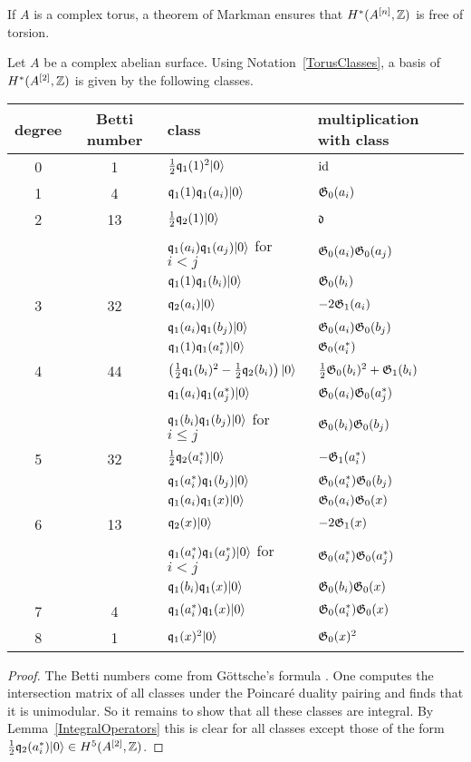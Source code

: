 \begin{remark}
If $A$ is a complex torus, a theorem of Markman \cite{Markman} ensures that $H^*(A^{[n]},\mathbb{Z})$ is free of torsion.
\end{remark} 

\begin{proposition} \label{A2Basis}
Let $A$ be a complex abelian surface. Using Notation~\ref{TorusClasses}, a basis of $H^*(A^{[2]},\mathbb{Z})$ is given by the following classes.
\begin{center}
\begin{tabular}{c|c|l|l}
 degree & Betti number & class & multiplication with class \\\hline
 0 & 1 & $\frac{1}{2}\mathfrak{q}_1(1)^2|0\rangle$ & $\operatorname{id}$ \\ \hline
 1 & 4 &  $\mathfrak{q}_1(1)\mathfrak{q}_1(a_i)|0\rangle$ & $\mathfrak{G}_0(a_i)$ \\ \hline
 2 & 13 & $\frac{1}{2}\mathfrak{q}_2(1)|0\rangle$ & $\mathfrak{d}$ \\ 
   &  & $\mathfrak{q}_1(a_i)\mathfrak{q}_1(a_j)|0\rangle$ for $i<j$ & $\mathfrak{G}_0(a_i)\mathfrak{G}_0(a_j)$ \\
   &  & $\mathfrak{q}_1(1)\mathfrak{q}_1(b_i)|0\rangle$ & $\mathfrak{G}_0(b_i)$ \\\hline
 3 & 32 & $\mathfrak{q}_2(a_i)|0\rangle$  & $-2\mathfrak{G}_1(a_i) $ \\
   &  & $\mathfrak{q}_1(a_i)\mathfrak{q}_1(b_j)|0\rangle$ & $\mathfrak{G}_0(a_i)\mathfrak{G}_0(b_j)$ \\ 
   &  & $\mathfrak{q}_1(1)\mathfrak{q}_1(a^*_i)|0\rangle$ & $\mathfrak{G}_0(a^*_i)$ \\\hline
 4 & 44 & $\left(\frac{1}{2}\mathfrak{q}_1(b_i)^2-\frac{1}{2}\mathfrak{q}_2(b_i)\right)|0\rangle$ & $\frac{1}{2} \mathfrak{G}_0(b_i)^2 + \mathfrak{G}_1(b_i) $ \\
   &  & $\mathfrak{q}_1(a_i)\mathfrak{q}_1(a^*_j)|0\rangle$ & $\mathfrak{G}_0(a_i)\mathfrak{G}_0(a^*_j)$ \\
   &  & $ \mathfrak{q}_1(b_i)\mathfrak{q}_1(b_j)|0\rangle$ for $i\leq j$ &  $\mathfrak{G}_0(b_i)\mathfrak{G}_0(b_j)$ \\\hline
 5 & 32 & $\frac{1}{2}\mathfrak{q}_2(a^*_i)|0\rangle$ & $-\mathfrak{G}_1(a^*_i)$ \\
   &  & $\mathfrak{q}_1(a^*_i)\mathfrak{q}_1(b_j)|0\rangle$ & $ \mathfrak{G}_0(a^*_i)\mathfrak{G}_0(b_j)$ \\
   &  & $\mathfrak{q}_1(a_i)\mathfrak{q}_1(x)|0\rangle$ & $\mathfrak{G}_0(a_i)\mathfrak{G}_0(x)$ \\\hline
 6 & 13 & $\mathfrak{q}_2(x)|0\rangle$ & $-2\mathfrak{G}_1(x)$ \\
   &  & $\mathfrak{q}_1(a^*_i)\mathfrak{q}_1(a^*_j)|0\rangle$ for $i<j$ & $\mathfrak{G}_0(a^*_i)\mathfrak{G}_0(a^*_j)$ \\
   &  & $\mathfrak{q}_1(b_i)\mathfrak{q}_1(x)|0\rangle$ & $ \mathfrak{G}_0(b_i)\mathfrak{G}_0(x)$ \\\hline
 7 & 4 & $\mathfrak{q}_1(a^*_i)\mathfrak{q}_1(x)|0\rangle$ & $\mathfrak{G}_0(a^*_i)\mathfrak{G}_0(x) $ \\\hline
 8 & 1 & $\mathfrak{q}_1(x)^2|0\rangle$ & $\mathfrak{G}_0(x)^2$ 
\end{tabular}
\end{center}
\begin{proof}
The Betti numbers come from G\"ottsche's formula \cite{Gottsche}.
One computes the intersection matrix of all classes under the Poincar\'e duality pairing and finds that it is unimodular. 
So it remains to show that all these classes are integral. By Lemma~\ref{IntegralOperators} this is clear for all classes except 
those of the form $\frac{1}{2}\mathfrak{q}_2(a^*_i)|0\rangle \in H^5(A^{[2]},\mathbb{Z})$.


\end{proof}
\end{proposition}
